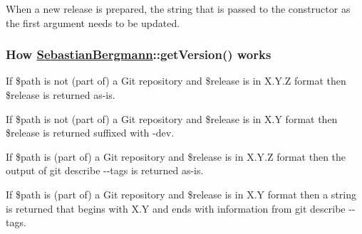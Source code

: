 When a new release is prepared, the string that is passed to the constructor as the first argument needs to be updated.

\subsubsection*{How \mbox{\hyperlink{namespace_sebastian_bergmann}{Sebastian\+Bergmann}}\+::get\+Version() works}


\begin{DoxyItemize}
\item If {\ttfamily \$path} is not (part of) a Git repository and {\ttfamily \$release} is in {\ttfamily X.\+Y.\+Z} format then {\ttfamily \$release} is returned as-\/is.
\item If {\ttfamily \$path} is not (part of) a Git repository and {\ttfamily \$release} is in {\ttfamily X.\+Y} format then {\ttfamily \$release} is returned suffixed with {\ttfamily -\/dev}.
\item If {\ttfamily \$path} is (part of) a Git repository and {\ttfamily \$release} is in {\ttfamily X.\+Y.\+Z} format then the output of {\ttfamily git describe -\/-\/tags} is returned as-\/is.
\item If {\ttfamily \$path} is (part of) a Git repository and {\ttfamily \$release} is in {\ttfamily X.\+Y} format then a string is returned that begins with {\ttfamily X.\+Y} and ends with information from {\ttfamily git describe -\/-\/tags}. 
\end{DoxyItemize}